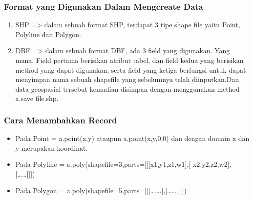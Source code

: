 \subsubsection{Format yang Digunakan Dalam Mengcreate Data}
\begin{enumerate}
     \item SHP => dalam sebuah format SHP, terdapat 3 tipe shape file yaitu Point, Polyline dan Polygon.
     \item DBF => dalam sebuah format DBF, ada 3 field yang digunakan. Yang mana, Field pertama  berisikan   atribut    tabel, dan                        field kedua yang berisikan method yang dapat digunakan, serta field yang ketiga berfungsi untuk dapat menyimpan                          nama sebuah shapefile yang sebelumnya telah diinputkan.Dan data geospasial tersebut kemudian disimpan dengan menggunakan method a.save \‘file.shp\’.
\end{enumerate}

\subsubsection{Cara Menambahkan Record}
\begin{itemize}
    \item Pada Point = \‘a.point(x,y)\’ ataupun \‘a.point(x,y,0,0)\’ dan dengan domain x dan y merupakan koordinat.
    \item Pada Polyline = \‘a.poly(shapefile=3,parts=[[[x1,y1,z1,w1],[ x2,y2,z2,w2],[……]]])\’
    \item Pada Polygon = \‘a.poly)shapefile=5,parts=[[[…….],[…….]]])\’
\end{itemize}

